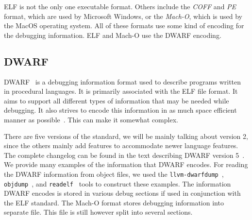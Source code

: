ELF is not the only one executable format. Others include the \textit{COFF} and
\textit{PE} format, which are used by Microsoft Windows, or the
\textit{Mach-O}, which is used by the MacOS operating system. All of these
formats use some kind of encoding for the debugging information. ELF and Mach-O
use the DWARF encoding.

\subsection{DWARF}
DWARF~\cite{dwarf} is a debugging information format used to describe programs
written in procedural languages. It is primarily associated with the ELF file
format. It aims to support all different types of information that may be
needed while debugging. It also strives to encode this information in as much
space efficient manner as possible~\cite{dwarf}. This can make it somewhat
complex. 

There are five versions of the standard, we will be mainly talking about
version 2, since the others mainly add features to accommodate newer language
features. The complete changelog can be found in the text describing DWARF
version 5~\cite{dwarf-5}. We provide many examples of the information that
DWARF encodes. For reading the DWARF information from object files, we used the
\texttt{llvm-dwarfdump}~\cite{dwarfdump}, \texttt{objdump}~\cite{objdump}, and
\texttt{readelf}~\cite{readelf} tools to construct these examples. The
information DWARF encodes is stored in various debug sections if used in
conjunction with the ELF standard. The Mach-O format stores debugging
information into separate file. This file is still however split into several
sections.

